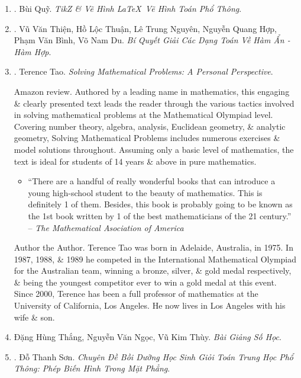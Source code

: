 \documentclass{article}
\begin{document}
\begin{enumerate}
	\item \cite{Quy_TikZ}. {\sc Bùi Quỹ}. {\it TikZ \& Vẽ Hình \LaTeX\ Vẽ Hình Toán Phổ Thông}.\hfill{\sf[reading]}
	
	\item \cite{Thien_Thuan_Nguyen_Hop_Binh_Du_function}. {\sc Vũ Văn Thiện, Hồ Lộc Thuận, Lê Trung Nguyên, Nguyễn Quang Hợp, Phạm Văn Bình, Võ Nam Du}. {\it Bí Quyết Giải Các Dạng Toán Về Hàm Ẩn - Hàm Hợp}.\hfill{\sf[reading]}
	
	\item \cite{Tao2006}. {\sc Terence Tao}. {\it Solving Mathematical Problems: A Personal Perspective}. {}
	
	{\sf Amazon review.} Authored by a leading name in mathematics, this engaging \& clearly presented text leads the reader through the various tactics involved in solving mathematical problems at the Mathematical Olympiad level. Covering number theory, algebra, analysis, Euclidean geometry, \& analytic geometry, Solving Mathematical Problems includes numerous exercises \& model solutions throughout. Assuming only a basic level of mathematics, the text is ideal for students of 14 years \& above in pure mathematics.
	\begin{itemize}
		\item ``There are a handful of really wonderful books that can introduce a young high-school student to the beauty of mathematics. This is definitely 1 of them. Besides, this book is probably going to be known as the 1st book written by 1 of the best mathematicians of the 21 century.'' -- {\it The Mathematical Asociation of America}
	\end{itemize}
	{\sf Author the Author.} {\sc Terence Tao} was born in Adelaide, Australia, in 1975. In 1987, 1988, \& 1989 he competed in the International Mathematical Olympiad for the Australian team, winning a bronze, silver, \& gold medal respectively, \& being the youngest competitor ever to win a gold medal at this event. Since 2000, Terence has been a full professor of mathematics at the University of California, Los Angeles. He now lives in Los Angeles with his wife \& son.
	
	\item {\sc Đặng Hùng Thắng, Nguyễn Văn Ngọc, Vũ Kim Thùy}. {\it Bài Giảng Số Học}.
	
	\item \cite{Son2006}. {\sc Đỗ Thanh Sơn}. {\it Chuyên Đề Bồi Dưỡng Học Sinh Giỏi Toán Trung Học Phổ Thông: Phép Biến Hình Trong Mặt Phẳng}.\hfill{\sf[reading]}	
\end{enumerate}
\end{document}
